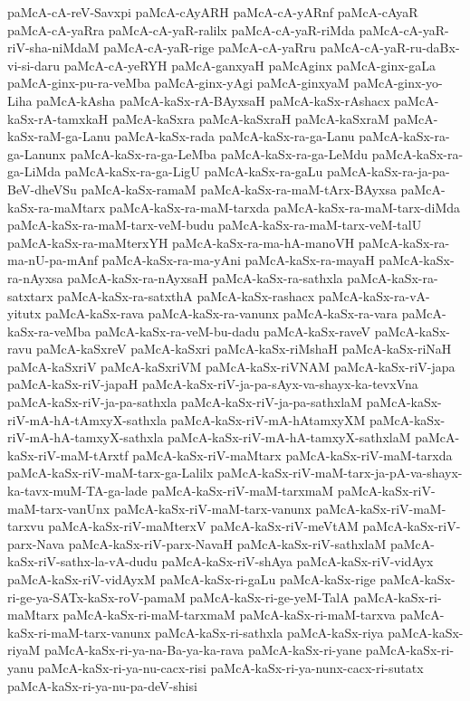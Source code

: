 {paMcA-cA-reV-Savxpi
paMcA-cAyARH
paMcA-cA-yARnf
paMcA-cAyaR
paMcA-cA-yaRra
paMcA-cA-yaR-ralilx
paMcA-cA-yaR-riMda
paMcA-cA-yaR-riV-sha-niMdaM
paMcA-cA-yaR-rige
paMcA-cA-yaRru
paMcA-cA-yaR-ru-daBx-vi-si-daru
paMcA-cA-yeRYH
paMcA-ganxyaH
paMcAginx
paMcA-ginx-gaLa
paMcA-ginx-pu-ra-veMba
paMcA-ginx-yAgi
paMcA-ginxyaM
paMcA-ginx-yo-Liha
paMcA-kAsha
paMcA-kaSx-rA-BAyxsaH
paMcA-kaSx-rAshacx
paMcA-kaSx-rA-tamxkaH
paMcA-kaSxra
paMcA-kaSxraH
paMcA-kaSxraM
paMcA-kaSx-raM-ga-Lanu
paMcA-kaSx-rada
paMcA-kaSx-ra-ga-Lanu
paMcA-kaSx-ra-ga-Lanunx
paMcA-kaSx-ra-ga-LeMba
paMcA-kaSx-ra-ga-LeMdu
paMcA-kaSx-ra-ga-LiMda
paMcA-kaSx-ra-ga-LigU
paMcA-kaSx-ra-gaLu
paMcA-kaSx-ra-ja-pa-BeV-dheVSu
paMcA-kaSx-ramaM
paMcA-kaSx-ra-maM-tArx-BAyxsa
paMcA-kaSx-ra-maMtarx
paMcA-kaSx-ra-maM-tarxda
paMcA-kaSx-ra-maM-tarx-diMda
paMcA-kaSx-ra-maM-tarx-veM-budu
paMcA-kaSx-ra-maM-tarx-veM-talU
paMcA-kaSx-ra-maMterxYH
paMcA-kaSx-ra-ma-hA-manoVH
paMcA-kaSx-ra-ma-nU-pa-mAnf
paMcA-kaSx-ra-ma-yAni
paMcA-kaSx-ra-mayaH
paMcA-kaSx-ra-nAyxsa
paMcA-kaSx-ra-nAyxsaH
paMcA-kaSx-ra-sathxla
paMcA-kaSx-ra-satxtarx
paMcA-kaSx-ra-satxthA
paMcA-kaSx-rashacx
paMcA-kaSx-ra-vA-yitutx
paMcA-kaSx-rava
paMcA-kaSx-ra-vanunx
paMcA-kaSx-ra-vara
paMcA-kaSx-ra-veMba
paMcA-kaSx-ra-veM-bu-dadu
paMcA-kaSx-raveV
paMcA-kaSx-ravu
paMcA-kaSxreV
paMcA-kaSxri
paMcA-kaSx-riMshaH
paMcA-kaSx-riNaH
paMcA-kaSxriV
paMcA-kaSxriVM
paMcA-kaSx-riVNAM
paMcA-kaSx-riV-japa
paMcA-kaSx-riV-japaH
paMcA-kaSx-riV-ja-pa-sAyx-va-shayx-ka-tevxVna
paMcA-kaSx-riV-ja-pa-sathxla
paMcA-kaSx-riV-ja-pa-sathxlaM
paMcA-kaSx-riV-mA-hA-tAmxyX-sathxla
paMcA-kaSx-riV-mA-hAtamxyXM
paMcA-kaSx-riV-mA-hA-tamxyX-sathxla
paMcA-kaSx-riV-mA-hA-tamxyX-sathxlaM
paMcA-kaSx-riV-maM-tArxtf
paMcA-kaSx-riV-maMtarx
paMcA-kaSx-riV-maM-tarxda
paMcA-kaSx-riV-maM-tarx-ga-Lalilx
paMcA-kaSx-riV-maM-tarx-ja-pA-va-shayx-ka-tavx-muM-TA-ga-lade
paMcA-kaSx-riV-maM-tarxmaM
paMcA-kaSx-riV-maM-tarx-vanUnx
paMcA-kaSx-riV-maM-tarx-vanunx
paMcA-kaSx-riV-maM-tarxvu
paMcA-kaSx-riV-maMterxV
paMcA-kaSx-riV-meVtAM
paMcA-kaSx-riV-parx-Nava
paMcA-kaSx-riV-parx-NavaH
paMcA-kaSx-riV-sathxlaM
paMcA-kaSx-riV-sathx-la-vA-dudu
paMcA-kaSx-riV-shAya
paMcA-kaSx-riV-vidAyx
paMcA-kaSx-riV-vidAyxM
paMcA-kaSx-ri-gaLu
paMcA-kaSx-rige
paMcA-kaSx-ri-ge-ya-SATx-kaSx-roV-pamaM
paMcA-kaSx-ri-ge-yeM-TalA
paMcA-kaSx-ri-maMtarx
paMcA-kaSx-ri-maM-tarxmaM
paMcA-kaSx-ri-maM-tarxva
paMcA-kaSx-ri-maM-tarx-vanunx
paMcA-kaSx-ri-sathxla
paMcA-kaSx-riya
paMcA-kaSx-riyaM
paMcA-kaSx-ri-ya-na-Ba-ya-ka-rava
paMcA-kaSx-ri-yane
paMcA-kaSx-ri-yanu
paMcA-kaSx-ri-ya-nu-cacx-risi
paMcA-kaSx-ri-ya-nunx-cacx-ri-sutatx
paMcA-kaSx-ri-ya-nu-pa-deV-shisi
}
